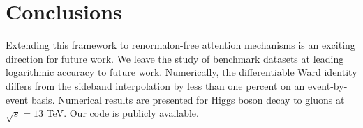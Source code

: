 \section{Conclusions}\label{sec:conclusions}

Extending this framework to renormalon-free attention mechanisms is an
exciting direction for future work. We leave the study of benchmark
datasets at leading logarithmic accuracy to future work. Numerically,
the differentiable Ward identity differs from the sideband interpolation
by less than one percent on an event-by-event basis. Numerical results
are presented for Higgs boson decay to gluons at $\sqrt{s} = 13$ TeV.
Our code is publicly available.

